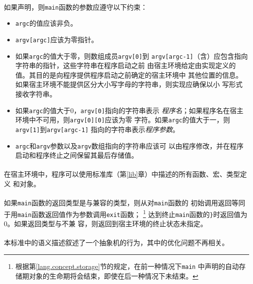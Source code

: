 \paragraph{}
如果声明，则\texttt{main}函数的参数应遵守以下约束：
\begin{itemize}
  \item{\texttt{argc}的值应该非负。}
  \item{\texttt{argv[argc]}应该为零指针。}
  \item{如果\texttt{argc}的值大于零，则数组成员\texttt{argv[0]}到
    \texttt{argv[argc-1]}（含）应包含指向字符串的指针，这些字符串在程序启动之前
    由宿主环境给定由实现定义的值。其目的是向程序提供程序启动之前确定的宿主环境中
    其他位置的信息。如果宿主环境不能提供区分大小写字母的字符串，则实现应确保以小
    写形式接收字符串。}
  \item{如果\texttt{argc}的值大于$0$，\texttt{argv[0]}指向的字符串表示
    \textit{程序名}；如果程序名在宿主环境中不可用，则\texttt{argv[0][0]}应该为零
    字符。如果\texttt{argc}的值大于一，则\texttt{argv[1]}到\texttt{argv[argc-1]}
    指向的字符串表示\textit{程序参数}。}
  \item{\texttt{argc}和\texttt{argv}参数以及\texttt{argv}数组指向的字符串应该可
    以由程序修改，并在程序启动和程序终止之间保留其最后存储值。}
\end{itemize}

\paragraph{}
在宿主环境中，程序可以使用标准库（第\ref{lib}章）中描述的所有函数、宏、类型定义
和对象。

\paragraph{}
如果\texttt{main}函数的返回类型是与兼容的类型，则从对\texttt{main}函数的
初始调用返回等同于用\texttt{main}函数返回值作为参数调用\texttt{exit}函数；
\footnote{根据第\ref{lang.concept.storage}节的规定，在前一种情况下\texttt{main}
中声明的自动存储期对象的生命期将会结束，即使在后一种情况下未结束。}
达到终止\texttt{main}函数的\texttt{\}}时返回值为$0$。如果返回类型与不兼
容，则返回到宿主环境的终止状态未指定。


\paragraph{}
本标准中的语义描述叙述了一个抽象机的行为，其中的优化问题不再相关。

